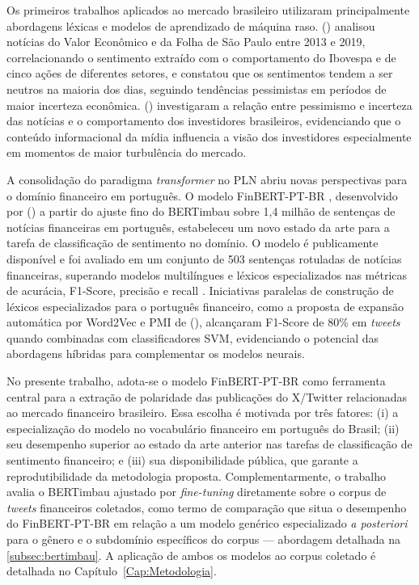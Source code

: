 Os primeiros trabalhos aplicados ao mercado brasileiro utilizaram principalmente abordagens léxicas e modelos de aprendizado de máquina raso. \citeauthor{falcao2020} (\citeyear{falcao2020}) analisou notícias do Valor Econômico e da Folha de São Paulo entre 2013 e 2019, correlacionando o sentimento extraído com o comportamento do Ibovespa e de cinco ações de diferentes setores, e constatou que os sentimentos tendem a ser neutros na maioria dos dias, seguindo tendências pessimistas em períodos de maior incerteza econômica. \citeauthor{galdi2018} (\citeyear{galdi2018}) investigaram a relação entre pessimismo e incerteza das notícias e o comportamento dos investidores brasileiros, evidenciando que o conteúdo informacional da mídia influencia a visão dos investidores especialmente em momentos de maior turbulência do mercado.

A consolidação do paradigma \textit{transformer} no PLN abriu novas perspectivas para o domínio financeiro em português. O modelo FinBERT-PT-BR \cite{santos2023finbert}, desenvolvido por \citeauthor{santos2023finbert} (\citeyear{santos2023finbert}) a partir do ajuste fino do BERTimbau \cite{souza2020} sobre 1,4 milhão de sentenças de notícias financeiras em português, estabeleceu um novo estado da arte para a tarefa de classificação de sentimento no domínio. O modelo é publicamente disponível e foi avaliado em um conjunto de 503 sentenças rotuladas de notícias financeiras, superando modelos multilíngues e léxicos especializados nas métricas de acurácia, F1-Score, precisão e recall \cite{santos2023finbert}. Iniciativas paralelas de construção de léxicos especializados para o português financeiro, como a proposta de expansão automática por Word2Vec e PMI de \citeauthor{sousa2025} (\citeyear{sousa2025}), alcançaram F1-Score de 80\% em \textit{tweets} quando combinadas com classificadores SVM, evidenciando o potencial das abordagens híbridas para complementar os modelos neurais.

No presente trabalho, adota-se o modelo FinBERT-PT-BR como ferramenta central para a extração de polaridade das publicações do X/Twitter relacionadas ao mercado financeiro brasileiro. Essa escolha é motivada por três fatores: (i) a especialização do modelo no vocabulário financeiro em português do Brasil; (ii) seu desempenho superior ao estado da arte anterior nas tarefas de classificação de sentimento financeiro; e (iii) sua disponibilidade pública, que garante a reprodutibilidade da metodologia proposta. Complementarmente, o trabalho avalia o BERTimbau \cite{souza2020} ajustado por \textit{fine-tuning} diretamente sobre o corpus de \textit{tweets} financeiros coletados, como termo de comparação que situa o desempenho do FinBERT-PT-BR em relação a um modelo genérico especializado \textit{a posteriori} para o gênero e o subdomínio específicos do corpus --- abordagem detalhada na \autoref{subsec:bertimbau}.  A aplicação de ambos os modelos ao corpus coletado é detalhada no Capítulo~\ref{Cap:Metodologia}.
